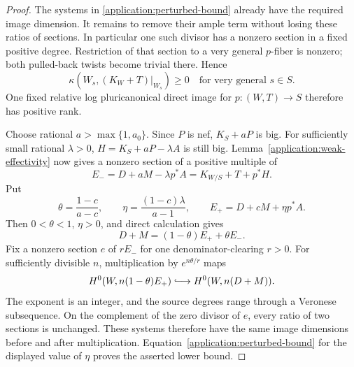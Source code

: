 \begin{proof}
The systems in \eqref{application:perturbed-bound} already have the required
image dimension. It remains to remove their ample term without
losing these ratios of sections. In particular one such divisor has
a nonzero section in a fixed
positive degree. Restriction of that section to a very general
$p$-fiber is nonzero; both pulled-back twists become trivial
there. Hence
\begin{equation}\label{application:p-fiber-nonvanishing}
 \kappa(W_s,(K_W+T)|_{W_s})\geq0
 \quad\text{for very general }s\in S.
\end{equation}
One fixed relative log pluricanonical direct image for
$p:(W,T)\to S$ therefore has positive rank.

Choose rational $a>\max\{1,a_0\}$. Since $P$ is nef,
$K_S+aP$ is big. For sufficiently small rational $\lambda>0$,
$H=K_S+aP-\lambda A$ is still big.
Lemma~\ref{application:weak-effectivity} now gives a nonzero section of a
positive multiple of
\begin{equation}\label{application:negative-twist}
 E_-=D+aM-\lambda p^*A
     =K_{W/S}+T+p^*H.
\end{equation}
Put
\[
 \theta=\frac{1-c}{a-c},
 \qquad \eta=\frac{(1-c)\lambda}{a-1},
 \qquad E_+=D+cM+\eta p^*A.
\]
Then $0<\theta<1$, $\eta>0$, and direct calculation gives
\begin{equation}\label{addition:cancel}
 D+M=(1-\theta)E_++\theta E_-.
\end{equation}
Fix a nonzero section $e$ of $rE_-$ for one denominator-clearing
$r>0$. For sufficiently divisible $n$, multiplication by
$e^{n\theta/r}$ maps
\[
 H^0(W,n(1-\theta)E_+)
       \lhook\joinrel\longrightarrow H^0(W,n(D+M)).
\]
The exponent is an integer, and the source degrees range through a
Veronese subsequence. On the complement of the zero divisor of $e$,
every ratio of two sections is unchanged. These systems therefore
have the same image dimensions before and after multiplication.
Equation~\eqref{application:perturbed-bound} for the displayed value of $\eta$
proves the asserted lower bound.
\end{proof}
